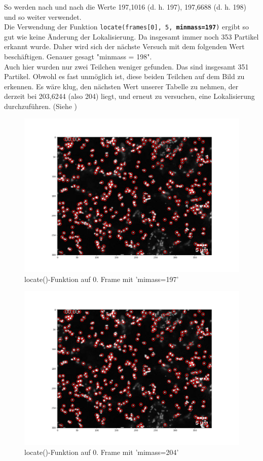 \begin{enumerate}
So werden nach und nach die Werte 197,1016 (d. h. 197), 197,6688 (d. h. 198) und so weiter verwendet.\\
Die Verwendung der Funktion \texttt{locate(frames[0], 5, \textbf{minmass=197})} ergibt so gut wie keine Änderung der Lokalisierung. Da insgesamt immer noch 353 Partikel  erkannt wurde. Daher wird sich der nächste Versuch mit dem folgenden Wert beschäftigen. Genauer gesagt "minmass = 198". \\
Auch hier wurden nur zwei Teilchen weniger gefunden. Das sind insgesamt 351 Partikel. Obwohl es fast unmöglich ist, diese beiden Teilchen auf dem Bild zu erkennen. 
Es wäre klug, den nächsten Wert unserer Tabelle zu nehmen, der derzeit bei 203,6244 (also 204) liegt, und erneut zu versuchen, eine Lokalisierung durchzuführen. (Siehe )

\begin{figure}[H]
    \centering
    \includegraphics[scale=0.35]{Grafiken/trackpyBilder/locate_with_minmass_02.png}
    \caption{locate()-Funktion auf 0. Frame mit 'mimass=197'}
    \label{fig:kap3_m=197}
\end{figure}


\begin{figure}[H]
    \centering
    \includegraphics[scale=0.35]{Grafiken/trackpyBilder/locate_with_minmass_04(204).png}
    \caption{locate()-Funktion auf 0. Frame mit 'mimass=204'}
    \label{fig:kap3_m=204}
\end{figure}


\end{enumerate}
